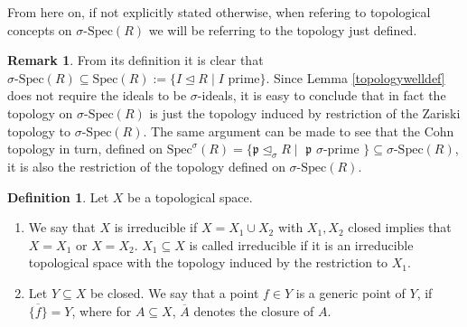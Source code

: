 \documentclass{article}
\def\p{\mathfrak{p}}
\def\s{\sigma}
\def\si{\unlhd_{\sigma}}
\def\Spec{\text{Spec}}
\def\sSpec{\sigma\text{-Spec}}
\theoremstyle{definition}
\newtheorem{rem}[Satz]{Remark}
\newtheorem{defn}[Satz]{Definition}
\begin{document}
From here on, if not explicitly stated otherwise, when refering to topological concepts on $\sSpec(R)$ we will be referring to the topology just defined.

\begin{rem}
From its definition it is clear that $\sSpec(R) \subseteq \Spec(R):= \{ I \unlhd R \mid I \text{ prime} \}$. Since Lemma \ref{topologywelldef} does not require the ideals to be $\s$-ideals, 
it is easy to conclude that in fact the topology on $\sSpec(R)$ is just the topology induced by restriction of the Zariski topology to $\sSpec(R)$. The same argument can be made to see that the Cohn topology in turn,
defined on $\Spec^\s(R) = \{ \p \si R \mid $ $\p$ $ \s$-prime $\} \subseteq \sSpec(R)$, it is also the restriction of the topology defined on $\sSpec(R)$. 
\end{rem}

\begin{defn}
Let $X$ be a topological space.
\begin{enumerate}
\item  We say that $X$ is irreducible if $X = X_1 \cup X_2$ with $X_1, X_2$ closed implies that $X = X_1$ or $X = X_2$. 
$X_1 \subseteq X$ is called irreducible if it is an irreducible topological space with the topology induced by the restriction to $X_1$.
\item Let $Y \subseteq X$ be closed. We say that a point $f \in Y$ is a generic point of $Y$, if $\overline{\{  f \} } = Y$, where for $A \subseteq X$, $\overline{A}$ denotes the closure of $A$.

\end{enumerate}
\end{defn}
\end{document}
